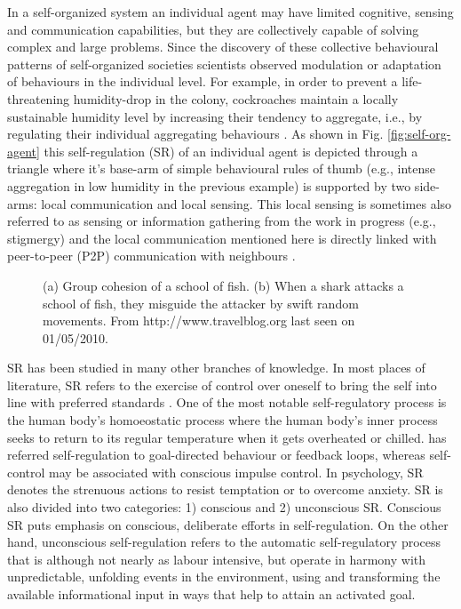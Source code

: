 In a self-organized system an individual agent may have limited cognitive, sensing and communication capabilities, but they are collectively capable of solving complex and large problems.  Since the discovery of these collective behavioural patterns of self-organized  societies scientists observed modulation or adaptation of behaviours in the individual level. For example, in order to prevent a life-threatening humidity-drop in the colony, cockroaches maintain a locally sustainable humidity level by increasing their tendency to aggregate, i.e., by regulating their individual aggregating behaviours \cite{Garnier+2007}. As shown in Fig. \ref{fig:self-org-agent} this  self-regulation (SR) of an individual agent is depicted through a triangle where it's base-arm of simple behavioural rules of thumb (e.g., intense aggregation in low humidity in the previous example) is supported by two side-arms: local communication and local sensing. This local sensing is sometimes also referred to as sensing or information gathering from the work in progress (e.g., stigmergy) and the local communication mentioned here is directly linked with peer-to-peer (P2P) communication with neighbours  \cite{Camazine+2001}.\\
\begin{figure}[htp]
\centering
{} 
\hspace{0.25cm}
\caption{(a) Group cohesion of a school of fish. (b) When a shark attacks a school of fish, they misguide the attacker by swift random movements. From http://www.travelblog.org last seen on 01/05/2010.}
\label{fig:school-of-fish}
\end{figure}
SR has been studied in many other branches of knowledge. In most places of literature, SR refers to the exercise of control over oneself to bring the self into line with preferred standards \cite{Baumeister+2007}. One of the most notable self-regulatory process is the human body's homoeostatic process where the human body's inner process seeks to return to its regular temperature when it gets overheated or chilled.  has referred self-regulation to goal-directed behaviour or feedback loops, whereas self-control may be associated with conscious impulse control.  In psychology, SR denotes the strenuous actions to resist temptation or to overcome anxiety. SR is also divided into two categories: 1) conscious and 2) unconscious SR. Conscious SR puts emphasis on conscious, deliberate efforts in self-regulation. On the other hand, unconscious self-regulation refers to the automatic self-regulatory process that is although not nearly as labour intensive, but operate in harmony with unpredictable, unfolding events in the environment, using and transforming the available informational input in ways that help to attain an activated goal.

